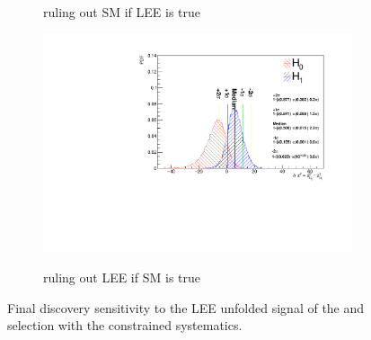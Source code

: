 \begin{figure}[H]
\begin{center}
\begin{subfigure}{0.45\textwidth}
    \label{fig:sensitivity_bdt_loose_const}
    \caption{ruling out SM if LEE is true}
    \end{subfigure}
    \begin{subfigure}{0.45\textwidth}
    \includegraphics[width=1.00\textwidth]{Sensitivity/sensitivity-run123/SBNfit_Cls_nue_1e0p_numu_reco_e_H1_mc_collab_syst_detsys_exclusionCNP_Chi.pdf}
    \label{fig:sensitivity_bdt_loose_const}
    \caption{ruling out LEE if SM is true}
    \end{subfigure}
    \caption{\label{fig:constrained_sensitivity}Final discovery sensitivity to the LEE unfolded signal of the \npsel and \zpsel selection with the constrained systematics.}
    \end{center}
\end{figure}


